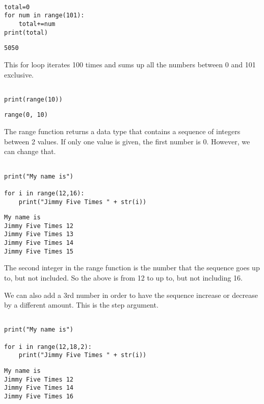 \documentclass[11pt]{article}
\begin{document}
\begin{verbatim}

total=0
for num in range(101):
    total+=num
print(total)

\end{verbatim}

\begin{verbatim}
5050
\end{verbatim}

This for loop iterates 100 times and sums up all the numbers between 0 and 101 exclusive.


\begin{verbatim}

print(range(10))

\end{verbatim}

\begin{verbatim}
range(0, 10)
\end{verbatim}


The range function returns a data type that contains a sequence of integers between 2 values. If only one value is given, the first number is 0. However, we can change that.

\begin{verbatim}

print("My name is")

for i in range(12,16):
    print("Jimmy Five Times " + str(i))

\end{verbatim}

\begin{verbatim}
My name is
Jimmy Five Times 12
Jimmy Five Times 13
Jimmy Five Times 14
Jimmy Five Times 15
\end{verbatim}


The second integer in the range function is the number that the sequence goes up to, but not included. So the above is from 12 to up to, but not including 16.

We can also add a 3rd number in order to have the sequence increase or decrease by a different amount. This is the step argument.


\begin{verbatim}

print("My name is")

for i in range(12,18,2):
    print("Jimmy Five Times " + str(i))

\end{verbatim}

\begin{verbatim}
My name is
Jimmy Five Times 12
Jimmy Five Times 14
Jimmy Five Times 16
\end{verbatim}
\end{document}
